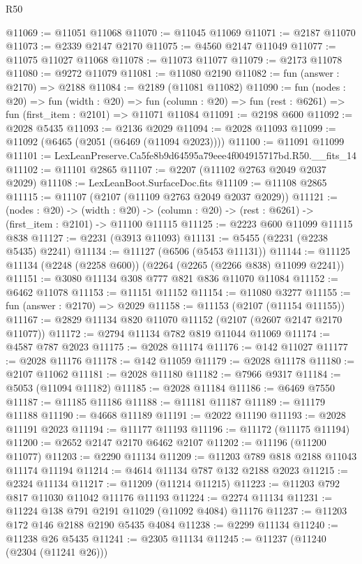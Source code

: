\begin{lexlean}{R50}
\begin{coremodule}
@11069 := @11051 @11068
@11070 := @11045 @11069
@11071 := @2187 @11070
@11073 := @2339 @2147 @2170
@11075 := @4560 @2147 @11049
@11077 := @11075 @11027 @11068
@11078 := @11073 @11077
@11079 := @2173 @11078
@11080 := @9272 @11079
@11081 := @11080 @2190
@11082 := fun (answer : @2170) => @2188
@11084 := @2189 (@11081 @11082)
@11090 := fun (nodes : @20) =>
  fun (width : @20) =>
  fun (column : @20) => fun (rest : @6261) => fun (first_item : @2101) => @11071 @11084
@11091 := @2198 @600
@11092 := @2028 @5435
@11093 := @2136 @2029
@11094 := @2028 @11093
@11099 := @11092 (@6465 (@2051 (@6469 (@11094 @2023))))
@11100 := @11091 @11099
@11101 := LexLeanPreserve.Ca5fe8b9d64595a79eee4f004915717bd.R50.__fits_14
@11102 := @11101 @2865
@11107 := @2207 (@11102 @2763 @2049 @2037 @2029)
@11108 := LexLeanBoot.SurfaceDoc.fits
@11109 := @11108 @2865
@11115 := @11107 (@2107 (@11109 @2763 @2049 @2037 @2029))
@11121 := (nodes : @20) ->
  (width : @20) -> (column : @20) -> (rest : @6261) -> (first_item : @2101) -> @11100 @11115
@11125 := @2223 @600 @11099 @11115 @838
@11127 := @2231 (@3913 @11093)
@11131 := @5455 (@2231 (@2238 @5435) @2241)
@11134 := @11127 (@6506 (@5453 @11131))
@11144 := @11125 @11134 (@2248 (@2258 @600)) (@2264 (@2265 (@2266 @838) @11099 @2241))
@11151 := @3080 @11134 @308 @777 @821 @836 @11070 @11084
@11152 := @6462 @11078
@11153 := @11151 @11152
@11154 := @11080 @3277
@11155 := fun (answer : @2170) => @2029
@11158 := @11153 (@2107 (@11154 @11155))
@11167 := @2829 @11134 @820 @11070 @11152 (@2107 (@2607 @2147 @2170 @11077))
@11172 := @2794 @11134 @782 @819 @11044 @11069
@11174 := @4587 @787 @2023
@11175 := @2028 @11174
@11176 := @142 @11027
@11177 := @2028 @11176
@11178 := @142 @11059
@11179 := @2028 @11178
@11180 := @2107 @11062
@11181 := @2028 @11180
@11182 := @7966 @9317
@11184 := @5053 (@11094 @11182)
@11185 := @2028 @11184
@11186 := @6469 @7550
@11187 := @11185 @11186
@11188 := @11181 @11187
@11189 := @11179 @11188
@11190 := @4668 @11189
@11191 := @2022 @11190
@11193 := @2028 @11191 @2023
@11194 := @11177 @11193
@11196 := @11172 (@11175 @11194)
@11200 := @2652 @2147 @2170 @6462 @2107
@11202 := @11196 (@11200 @11077)
@11203 := @2290 @11134
@11209 := @11203 @789 @818 @2188 @11043 @11174 @11194
@11214 := @4614 @11134 @787 @132 @2188 @2023
@11215 := @2324 @11134
@11217 := @11209 (@11214 @11215)
@11223 := @11203 @792 @817 @11030 @11042 @11176 @11193
@11224 := @2274 @11134
@11231 := @11224 @138 @791 @2191 @11029 (@11092 @4084) @11176
@11237 := @11203 @172 @146 @2188 @2190 @5435 @4084
@11238 := @2299 @11134
@11240 := @11238 @26 @5435
@11241 := @2305 @11134
@11245 := @11237 (@11240 (@2304 (@11241 @26)))

\end{coremodule}
\end{lexlean}
